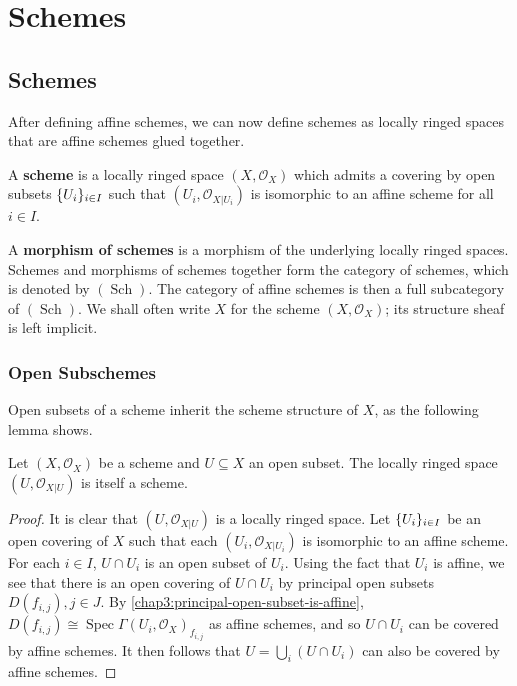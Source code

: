 \documentclass[12pt]{book}
\newcommand{\inlinedef}[1]{\textcolor{oxfordblue}{\bfseries #1}}
\theoremstyle{definition}
\DeclarePairedDelimiter{\Set}{\lbrace}{\rbrace}
\DeclareMathOperator{\Spec}{Spec}
\newcommand{\Schs}{\operatorname{Sch}}
\begin{document}
	
	
	\chapter{Schemes}
	
	\section{Schemes}
	
	After defining affine schemes, we can now define schemes as locally ringed spaces that are affine schemes glued together.
	
	\begin{definition}
		A \inlinedef{scheme} is a locally ringed space $(X, \mathcal{O}_X)$ which admits a covering by open subsets $\Set{U_i}_{i \in I}$ such that $(U_i, \mathcal{O}_{X | U_i})$ is isomorphic to an affine scheme for all $i \in I$.
	\end{definition}
	
	A \inlinedef{morphism of schemes} is a morphism of the underlying locally ringed spaces. Schemes and morphisms of schemes together form the category of schemes, which is denoted by $(\Schs)$. The category of affine schemes is then a full subcategory of $(\Schs)$. We shall often write $X$ for the scheme $(X, \mathcal{O}_X)$; its structure sheaf is left implicit.
	
	\subsection*{Open Subschemes}
	
	Open subsets of a scheme inherit the scheme structure of $X$, as the following lemma shows.
	
	\begin{lemma}
		Let $(X, \mathcal{O}_X)$ be a scheme and $U \subseteq X$ an open subset. The locally ringed space $(U, \mathcal{O}_{X|U})$ is itself a scheme. 
	\end{lemma}
	\begin{proof}
		It is clear that $(U, \mathcal{O}_{X|U})$ is a locally ringed space. Let $\Set{U_i}_{i \in I}$ be an open covering of $X$ such that each $(U_i, \mathcal{O}_{X|U_i})$ is isomorphic to an affine scheme. For each $i \in I$, $U \cap U_i$ is an open subset of $U_i$. Using the fact that $U_i$ is affine, we see that there is an open covering of $U \cap U_i$ by principal open subsets $D(f_{i,j}), {j \in J}$. By \cref{chap3:principal-open-subset-is-affine}, $D(f_{i,j}) \cong \Spec \Gamma(U_i, \mathcal{O}_X)_{f_{i,j}}$ as affine schemes, and so $U \cap U_i$ can be covered by affine schemes. It then follows that $U = \bigcup_i (U \cap U_i)$ can also be covered by affine schemes.
	\end{proof}
	
\end{document}
